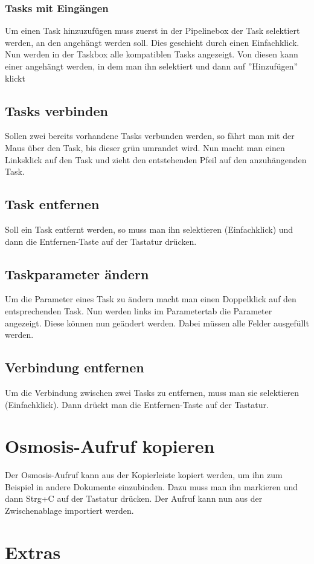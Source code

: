 \documentclass[a4paper,10pt]{scrartcl}
\begin{document}
\subsubsection{Tasks mit Eingängen}
Um einen Task hinzuzufügen muss zuerst in der Pipelinebox der Task selektiert werden, an den angehängt werden soll. Dies geschieht durch einen Einfachklick. Nun werden in der Taskbox alle kompatiblen Tasks angezeigt. Von diesen kann einer angehängt werden, in dem man ihn selektiert und dann auf ''Hinzufügen'' klickt
\subsection{Tasks verbinden}
Sollen zwei bereits vorhandene Tasks verbunden werden, so fährt man mit der Maus über den Task, bis dieser grün umrandet wird. Nun macht man einen Linksklick auf den Task und zieht den entstehenden Pfeil auf den anzuhängenden Task.
\subsection{Task entfernen}
Soll ein Task entfernt werden, so muss man ihn selektieren (Einfachklick) und dann die Entfernen-Taste auf der Tastatur drücken. 
\subsection{Taskparameter ändern}
Um die Parameter eines Task zu ändern macht man einen Doppelklick auf den entsprechenden Task. Nun werden links im Parametertab die Parameter angezeigt. Diese können nun geändert werden. Dabei müssen alle Felder ausgefüllt werden. 
\subsection{Verbindung entfernen}
Um die Verbindung zwischen zwei Tasks zu entfernen, muss man sie selektieren (Einfachklick). Dann drückt man die Entfernen-Taste auf der Tastatur. 

\section{Osmosis-Aufruf kopieren}
Der Osmosis-Aufruf kann aus der Kopierleiste kopiert werden, um ihn zum Beispiel in andere Dokumente einzubinden. Dazu muss man ihn markieren und dann Strg+C auf der Tastatur drücken. Der Aufruf kann nun aus der Zwischenablage importiert werden.

\section{Extras}
\end{document}
